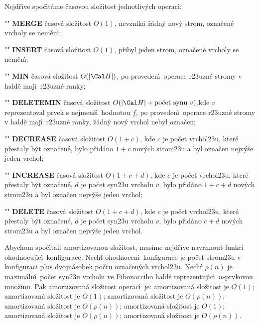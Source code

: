 \flushpar Nejd\v r\'\i ve spo\v c\'\i t\'ame \v casovou slo\v zitost 
jednotliv\'ych operac\'\i :
\roster
\item"{}"
{\bf MERGE }\v casov\'a slo\v zitost $O(1)$, nevznik\'a \v z\'adn\'y nov\'y strom, ozna\-\v ce\-n\'e vrcholy se nem\v en\'\i;
\item"{}" 
{\bf INSERT }\v casov\'a slo\v zitost $O(1)$, p\v ribyl jeden strom, 
ozna\v cen\'e vrcholy se nem\v en\'\i;
\item"{}"
{\bf MIN }\v casov\'a slo\v zitost $O(|\Cal H|)$, po proveden\'\i\ operace 
r\accent23uzn\'e stro\-my v hald\v e maj\'\i\ r\accent23uzn\'e 
ranky;  
\item"{}"
{\bf DELETEMIN }\v casov\'a slo\v zitost $O(|\Cal H|+\text{\rm po\v cet syn\accent23u }v)$,kde $v$ reprezentoval prvek s nejmen\v s\'\i\ hodnotou $f$, po proveden\'\i\ ope\-ra\-ce r\accent23uzn\'e stromy v hald\v e maj\'\i\ 
r\accent23uzn\'e ranky, \v z\'adn\'y nov\'y vrchol nebyl ozna\v cen; 
\item"{}"
{\bf DECREASE }\v casov\'a slo\v zitost $O(1+c)$, kde $c$ je po\v cet 
vrchol\accent23u, kter\'e p\v restaly b\'yt ozna\v cen\'e, 
bylo p\v rid\'ano $1+c$ nov\'ych strom\accent23u a byl ozna\v cen 
nejv\'y\v se jeden vrchol;
\item"{}"
{\bf INCREASE }\v casov\'a slo\v zitost $O(1+c+d)$, kde $c$ je po\v cet 
vrchol\accent23u, kter\'e p\v restaly b\'yt ozna\v cen\'e, $d$ je 
po\v cet syn\accent23u vrcholu $v$, bylo p\v rid\'ano $1+c+d$ 
nov\'ych strom\accent23u a byl ozna\v cen nejv\'y\v se jeden 
vrchol;
\item"{}"
{\bf DELETE }\v casov\'a slo\v zitost $O(1+c+d)$, kde $c$ je po\v cet 
vrchol\accent23u, kter\'e p\v restaly b\'yt ozna\v cen\'e, $d$ je 
po\v cet syn\accent23u vrcholu $v$, bylo p\v rid\'ano $c+d$ 
nov\'ych strom\accent23u a byl ozna\v cen nejv\'y\v se jeden 
vrchol.
\endroster

\flushpar Abychom spo\v c\'\i tali amortizovanou slo\v zitost, 
mus\'\i me nejd\v r\'\i ve navrhnout funkci ohodnocuj\'\i\-c\'\i\ 
konfigurace.  Nech\v t ohodnocen\'\i\ konfigurace je po\v cet 
strom\accent23u v konfiguraci plus dvojn\'aso\-bek po\v ctu 
ozna\v cen\'ych vrchol\accent23u.  Nech\v t $\rho (n)$ je maxim\'aln\'\i\ 
po\v cet syn\accent23u vrcholu ve Fibonacciho hald\v e 
reprezentuj\'\i c\'\i\ $n$-prvkovou mno\v zinu.  Pak amortizovan\'a 
slo\v zitost operac\'\i\ je:\newline 
\phantom{---}{\bf MERGE} amortizovan\'a slo\v zitost je $O(1)$;\newline 
\phantom{---}{\bf INSERT} amortizovan\'a slo\v zitost je $O(1)$;\newline 
\phantom{---}{\bf MIN} amortizovan\'a slo\v zitost je $O(\rho (n))$;\newline 
\phantom{---}{\bf DELETEMIN} amortizovan\'a slo\v zitost je 
$O(\rho (n))$;\newline 
\phantom{---}{\bf DECREASE} amortizovan\'a slo\v zitost je $O(1)$;\newline 
\phantom{---}{\bf INCREASE} amortizovan\'a slo\v zitost je 
$O(\rho (n))$;\newline 
\phantom{---}{\bf DELETE} amortizovan\'a slo\v zitost je $O(\rho (n))$.
\medskip

